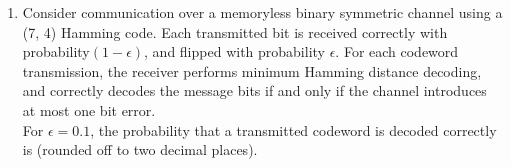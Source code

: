 \begin{enumerate}[label=\thechapter.\arabic*,ref=\thechapter.\theenumi]
\item Consider communication over a memoryless binary symmetric channel using a
(7, 4) Hamming code. Each transmitted bit is received correctly with probability$(1 - \epsilon)$, and flipped with probability $\epsilon$. For each codeword transmission, the receiver
performs minimum Hamming distance decoding, and correctly decodes the message
bits if and only if the channel introduces at most one bit error.
\\For $\epsilon = 0.1$, the probability that a transmitted codeword is decoded correctly is
 \textunderscore\textunderscore\textunderscore\textunderscore\textunderscore\textunderscore (rounded off to two decimal places).
\\

\end{enumerate}
